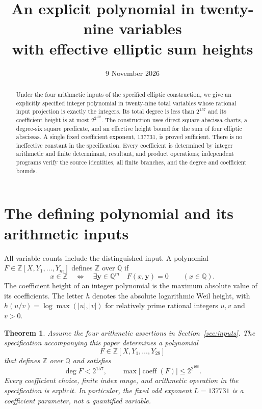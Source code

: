 \documentclass[11pt,a4paper]{article}
\title{An explicit polynomial in twenty-nine variables\\
with effective elliptic sum heights}
\author{}\date{9 November 2026}
\newtheorem{theorem}{Theorem}\newtheorem{lemma}[theorem]{Lemma}
\newcommand{\Q}{\mathbb Q}\newcommand{\Z}{\mathbb Z}
\begin{document}
\maketitle
\begin{abstract}
Under the four arithmetic inputs of the specified elliptic construction,
we give an explicitly specified integer polynomial in twenty-nine total
variables whose rational input projection is exactly the integers.
Its total degree is less than $2^{157}$ and its coefficient height is
at most $2^{2^{168}}$. The construction uses direct square-abscissa
charts, a degree-six square predicate, and an effective height bound
for the sum of four elliptic abscissas. A single fixed coefficient
exponent, $137731$, is proved sufficient. There is no ineffective
constant in the specification. Every coefficient is determined by
integer arithmetic and finite determinant, resultant, and
product operations; independent programs verify the source identities,
all finite branches, and the degree and coefficient bounds.
\end{abstract}

\section{The defining polynomial and its arithmetic inputs}

All variable counts include the distinguished input. A polynomial
$F\in\Z[X,Y_1,\ldots,Y_m]$ defines $\Z$ over $\Q$ if
\[
 x\in\Z\quad\Longleftrightarrow\quad
 \exists\mathbf y\in\Q^m\quad F(x,\mathbf y)=0
 \qquad(x\in\Q).
\]
The coefficient height of an integer polynomial is the maximum
absolute value of its coefficients. The letter $h$ denotes the
absolute logarithmic Weil height, with $h(u/v)=\log\max(|u|,|v|)$
for relatively prime rational integers $u,v$ and $v>0$.

\begin{theorem}\label{thm:main}
Assume the four arithmetic assertions in Section~\ref{sec:inputs}.
The specification accompanying this paper determines a polynomial
\[
                   F\in\Z[X,Y_1,\ldots,Y_{28}]
\]
that defines $\Z$ over $\Q$ and satisfies
\[
             \deg F<2^{157},\qquad
             \max|\operatorname{coeff}(F)|\le2^{2^{168}}.
\]
Every coefficient choice, finite index range, and arithmetic operation
in the specification is explicit. In particular, the fixed odd exponent
$L=137731$ is a coefficient parameter, not a quantified variable.
\end{theorem}
\end{document}
